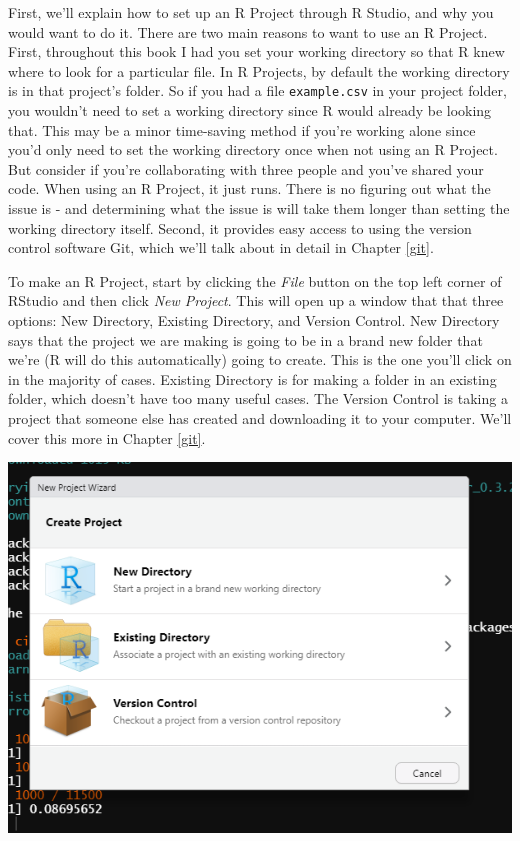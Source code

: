 \documentclass[
  12pt,
]{book}
\begin{document}
First, we'll explain how to set up an R Project through R Studio, and why you would want to do it. There are two main reasons to want to use an R Project. First, throughout this book I had you set your working directory so that R knew where to look for a particular file. In R Projects, by default the working directory is in that project's folder. So if you had a file \texttt{example.csv} in your project folder, you wouldn't need to set a working directory since R would already be looking that. This may be a minor time-saving method if you're working alone since you'd only need to set the working directory once when not using an R Project. But consider if you're collaborating with three people and you've shared your code. When using an R Project, it just runs. There is no figuring out what the issue is - and determining what the issue is will take them longer than setting the working directory itself. Second, it provides easy access to using the version control software Git, which we'll talk about in detail in Chapter \ref{git}.

To make an R Project, start by clicking the \emph{File} button on the top left corner of RStudio and then click \emph{New Project}. This will open up a window that that three options: New Directory, Existing Directory, and Version Control. New Directory says that the project we are making is going to be in a brand new folder that we're (R will do this automatically) going to create. This is the one you'll click on in the majority of cases. Existing Directory is for making a folder in an existing folder, which doesn't have too many useful cases. The Version Control is taking a project that someone else has created and downloading it to your computer. We'll cover this more in Chapter \ref{git}.

\includegraphics{images/new_project_1.PNG}
\end{document}
